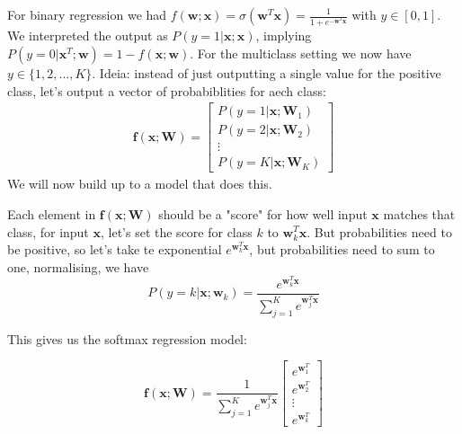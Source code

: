 \documentclass[a4paper, 11pt]{article}
\begin{document}
For binary regression we had $f(\mathbf{w};\mathbf{x}) = \sigma(\mathbf{w}^{T}\mathbf{x}) = \frac{1}{1 + e^{-\mathbf{w}^{T}\mathbf{x}}}$ with $y\in[0, 1]$. We interpreted
the output as $P(y = 1|\mathbf{x};\mathbf{x})$, implying $P(y = 0|\mathbf{x}^{T};\mathbf{w}) = 1 - f(\mathbf{x};\mathbf{w})$.
For the multiclass setting we now have $y\in\{1, 2, \dots, K\}$. Ideia: instead of just outputting a single value for the positive class, let's output a vector
of probabiblities for aech class:
\begin{align*}
        \mathbf{f}(\mathbf{x};\mathbf{W}) = \left[
                \begin{array}{c}
                        P(y = 1|\mathbf{x};\mathbf{W}_1)\\
                        P(y = 2|\mathbf{x};\mathbf{W}_2)\\
                        \vdots\\
                        P(y = K|\mathbf{x};\mathbf{W}_K)
                \end{array}
                \right]
\end{align*}
We will now build up to a model that does this. 

Each element in $\mathbf{f}(\mathbf{x};\mathbf{W})$ should be a "score" for how well input $\mathbf{x}$ matches that class, for input $\mathbf{x}$, let's set the score for class $k$ to $\mathbf{w}_{k}^{T}\mathbf{x}$.
But probabilities need to be positive, so let's take te exponential $e^{\mathbf{w}_{k}^{T}\mathbf{x}}$, but probabilities need to sum to one, normalising, we have
\begin{equation}
        P(y = k|\mathbf{x};\mathbf{w}_k) = \frac{e^{\mathbf{w}_{k}^{T}\mathbf{x}}}{\sum\limits_{j = 1}^{K}e^{\mathbf{w}_{j}^{T}\mathbf{x}}}
\end{equation}

This gives us the softmax regression model:

\begin{equation*}
        \mathbf{f}(\mathbf{x};\mathbf{W}) = \frac{1}{\sum\limits_{j = 1}^{K}e^{\mathbf{w}_{j}^{T}\mathbf{x}}}\left[\begin{array}{c}
        e^{\mathbf{w}_{1}^{T}}\\
        e^{\mathbf{w}_{2}^{T}}\\
        \vdots\\
        e^{\mathbf{w}_{k}^{T}}
        \end{array}\right]
\end{equation*}
\end{document}
